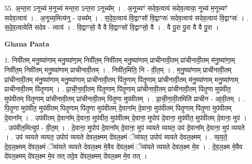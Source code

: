 \documentclass[17pt]{extarticle}
\begin{document}
55. अ॒न्त॒रा ऽनूच्य॑ म॒नूच्य॑ मन्त॒रा ऽन्त॒रा ऽनूच्य᳚म् । . अ॒नूच्यꣳ॑ सदेव॒त्वाय॑ सदेव॒त्वाया॒ नूच्य॑ म॒नूच्यꣳ॑ सदेव॒त्वाय॑ । . अ॒नूच्य॒मित्य॑नु - उच्य᳚म् । . स॒दे॒व॒त्वाय॑ वि॒द्वाꣳसो॑ वि॒द्वाꣳसः॑ सदेव॒त्वाय॑ सदेव॒त्वाय॑ वि॒द्वाꣳसः॑ । . स॒दे॒व॒त्वायेति॑ सदेव - त्वाय॑ । . वि॒द्वाꣳसो॒ वै वै वि॒द्वाꣳसो॑ वि॒द्वाꣳसो॒ वै । . वै पु॒रा पु॒रा वै वै पु॒रा । \newline

\textbf{Ghana Paata } \newline

1. निवी॑तम् मनु॒ष्या॑णाम् मनु॒ष्या॑णा॒म् निवी॑त॒म् निवी॑तम् मनु॒ष्या॑णाम् प्राचीनावी॒तम् प्रा॑चीनावी॒तम् म॑नु॒ष्या॑णा॒म् निवी॑त॒म् निवी॑तम् मनु॒ष्या॑णाम् प्राचीनावी॒तम् । . निवी॑त॒मिति॒ नि - वी॒त॒म् । . म॒नु॒ष्या॑णाम् प्राचीनावी॒तम् प्रा॑चीनावी॒तम् म॑नु॒ष्या॑णाम् मनु॒ष्या॑णाम् प्राचीनावी॒तम् पि॑तृ॒णाम् पि॑तृ॒णाम् प्रा॑चीनावी॒तम् म॑नु॒ष्या॑णाम् मनु॒ष्या॑णाम् प्राचीनावी॒तम् पि॑तृ॒णाम् । . प्रा॒ची॒ना॒वी॒तम् पि॑तृ॒णाम् पि॑तृ॒णाम् प्रा॑चीनावी॒तम् प्रा॑चीनावी॒तम् पि॑तृ॒णा मुप॑वीत॒ मुप॑वीतम् पितृ॒णाम् प्रा॑चीनावी॒तम् प्रा॑चीनावी॒तम् पि॑तृ॒णा मुप॑वीतम् । . प्रा॒ची॒ना॒वी॒तमिति॑ प्राचीन - आ॒वी॒तम् । . पि॒तृ॒णा मुप॑वीत॒ मुप॑वीतम् पितृ॒णाम् पि॑तृ॒णा मुप॑वीतम् दे॒वाना᳚म् दे॒वाना॒ मुप॑वीतम् पितृ॒णाम् पि॑तृ॒णा मुप॑वीतम् दे॒वाना᳚म् । . उप॑वीतम् दे॒वाना᳚म् दे॒वाना॒ मुप॑वीत॒ मुप॑वीतम् दे॒वाना॒ मुपोप॑ दे॒वाना॒ मुप॑वीत॒ मुप॑वीतम् दे॒वाना॒ मुप॑ । . उप॑वीत॒मित्युप॑ - वी॒त॒म् । . दे॒वाना॒ मुपोप॑ दे॒वाना᳚म् दे॒वाना॒ मुप॑ व्ययते व्ययत॒ उप॑ दे॒वाना᳚म् दे॒वाना॒ मुप॑ व्ययते । . उप॑ व्ययते व्ययत॒ उपोप॑ व्ययते देवल॒क्ष्मम् दे॑वल॒क्ष्मं ॅव्य॑यत॒ उपोप॑ व्ययते देवल॒क्ष्मम् । . व्य॒य॒ते॒ दे॒व॒ल॒क्ष्मम् दे॑वल॒क्ष्मं ॅव्य॑यते व्ययते देवल॒क्ष्म मे॒वैव दे॑वल॒क्ष्मं ॅव्य॑यते व्ययते देवल॒क्ष्म मे॒व । . दे॒व॒ल॒क्ष्म मे॒वैव दे॑वल॒क्ष्मम् दे॑वल॒क्ष्म मे॒व तत् तदे॒व दे॑वल॒क्ष्मम् दे॑वल॒क्ष्म मे॒व तत् । \newline
\end{document}

